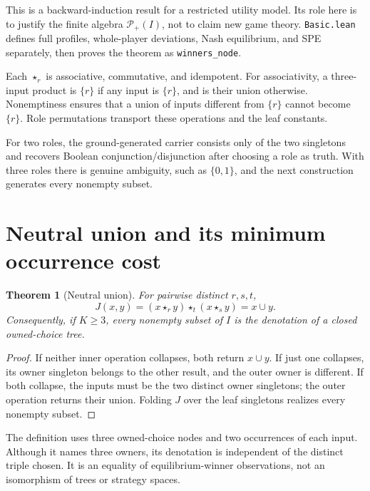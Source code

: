\documentclass[11pt]{article}
\newtheorem{theorem}{Theorem}[section]
\newcommand{\ow}[1]{\mathbin{\star_{#1}}}
\newcommand{\Pow}{\mathcal P_{+}}
\begin{document}
This is a backward-induction result for a restricted utility model. Its
role here is to justify the finite algebra $\Pow(I)$, not to claim new
game theory. \texttt{Basic.lean} defines full profiles, whole-player
deviations, Nash equilibrium, and SPE separately, then proves the theorem
as \texttt{winners\_node}.

Each $\star_r$ is associative, commutative, and idempotent. For
associativity, a three-input product is $\{r\}$ if any input is $\{r\}$,
and is their union otherwise. Nonemptiness ensures that a union of inputs
different from $\{r\}$ cannot become $\{r\}$. Role permutations transport
these operations and the leaf constants.

For two roles, the ground-generated carrier consists only of the two
singletons and recovers Boolean conjunction/disjunction after choosing a
role as truth. With three roles there is genuine ambiguity, such as
$\{0,1\}$, and the next construction generates every nonempty subset.

\section{Neutral union and its minimum occurrence cost}

\begin{theorem}[Neutral union]\label{thm:union}
For pairwise distinct $r,s,t$,
\begin{equation}\label{eq:union}
 J(x,y)=(x\ow r y)\ow t(x\ow s y)=x\cup y.
\end{equation}
Consequently, if $K\geq3$, every nonempty subset of $I$ is the
denotation of a closed owned-choice tree.
\end{theorem}
\begin{proof}
If neither inner operation collapses, both return $x\cup y$. If just one
collapses, its owner singleton belongs to the other result, and the outer
owner is different. If both collapse, the inputs must be the two distinct
owner singletons; the outer operation returns their union. Folding $J$
over the leaf singletons realizes every nonempty subset.
\end{proof}

The definition uses three owned-choice nodes and two occurrences of each
input. Although it names three owners, its denotation is independent of
the distinct triple chosen. It is an equality of equilibrium-winner
observations, not an isomorphism of trees or strategy spaces.
\end{document}
